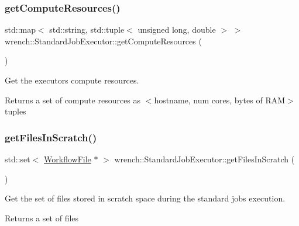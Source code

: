 \subsubsection{\texorpdfstring{get\+Compute\+Resources()}{getComputeResources()}}
{\footnotesize\ttfamily std\+::map$<$ std\+::string, std\+::tuple$<$ unsigned long, double $>$ $>$ wrench\+::\+Standard\+Job\+Executor\+::get\+Compute\+Resources (\begin{DoxyParamCaption}{ }\end{DoxyParamCaption})}



Get the executor\textquotesingle{}s compute resources. 

\begin{DoxyReturn}{Returns}
a set of compute resources as $<$hostname, num cores, bytes of R\+AM$>$ tuples 
\end{DoxyReturn}
\mbox{\label{classwrench_1_1_standard_job_executor_a655565a462444bbf5bd6f9fd426f273f}} 
\subsubsection{\texorpdfstring{get\+Files\+In\+Scratch()}{getFilesInScratch()}}
{\footnotesize\ttfamily std\+::set$<$ \hyperlink{classwrench_1_1_workflow_file}{Workflow\+File} $\ast$ $>$ wrench\+::\+Standard\+Job\+Executor\+::get\+Files\+In\+Scratch (\begin{DoxyParamCaption}{ }\end{DoxyParamCaption})}



Get the set of files stored in scratch space during the standard job\textquotesingle{}s execution. 

\begin{DoxyReturn}{Returns}
a set of files 
\end{DoxyReturn}
\mbox{\label{classwrench_1_1_standard_job_executor_ad2a9733a6c1b68007c13f71d75c7805f}} 
